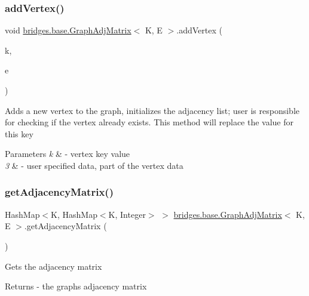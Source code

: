 \subsubsection{\texorpdfstring{add\+Vertex()}{addVertex()}}
{\footnotesize\ttfamily void \hyperlink{classbridges_1_1base_1_1_graph_adj_matrix}{bridges.\+base.\+Graph\+Adj\+Matrix}$<$ K, E $>$.add\+Vertex (\begin{DoxyParamCaption}\item[{K}]{k,  }\item[{E}]{e }\end{DoxyParamCaption})}

Adds a new vertex to the graph, initializes the adjacency list; user is responsible for checking if the vertex already exists. This method will replace the value for this key


\begin{DoxyParams}{Parameters}
{\em k} & -\/ vertex key value \\
\hline
{\em 3} & -\/ user specified data, part of the vertex data \\
\hline
\end{DoxyParams}
\hypertarget{classbridges_1_1base_1_1_graph_adj_matrix_a2bf0bf69333497b3b97788b74fe1f5b7}{}\label{classbridges_1_1base_1_1_graph_adj_matrix_a2bf0bf69333497b3b97788b74fe1f5b7} 
\subsubsection{\texorpdfstring{get\+Adjacency\+Matrix()}{getAdjacencyMatrix()}}
{\footnotesize\ttfamily Hash\+Map$<$K, Hash\+Map$<$K, Integer$>$ $>$ \hyperlink{classbridges_1_1base_1_1_graph_adj_matrix}{bridges.\+base.\+Graph\+Adj\+Matrix}$<$ K, E $>$.get\+Adjacency\+Matrix (\begin{DoxyParamCaption}{ }\end{DoxyParamCaption})}

Gets the adjacency matrix

\begin{DoxyReturn}{Returns}
-\/ the graph\textquotesingle{}s adjacency matrix 
\end{DoxyReturn}
\hypertarget{classbridges_1_1base_1_1_graph_adj_matrix_aa837a6bd0afbc700bf6277a062c5fdae}{}\label{classbridges_1_1base_1_1_graph_adj_matrix_aa837a6bd0afbc700bf6277a062c5fdae} 
